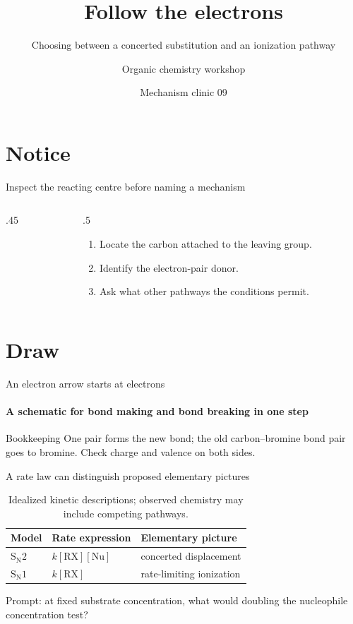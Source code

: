 \documentclass[11pt,aspectratio=169]{beamer}
\title{Follow the electrons}
\subtitle{Choosing between a concerted substitution and an ionization pathway}
\author{Organic chemistry workshop}
\date{Mechanism clinic 09}
\begin{document}
\begin{frame}[plain]\titlepage\end{frame}
\section{Notice}
\begin{frame}{Inspect the reacting centre before naming a mechanism}
\begin{columns}[c]
\begin{column}{.45\textwidth}\centering
{}
\bigskip\par
{\footnotesize{}}
\end{column}
\begin{column}{.5\textwidth}
\begin{enumerate}[<+->]
\item Locate the carbon attached to the leaving group.
\item Identify the electron-pair donor.
\item Ask what other pathways the conditions permit.
\end{enumerate}
\end{column}
\end{columns}
\end{frame}
\section{Draw}
\begin{frame}{An electron arrow starts at electrons}
\framesubtitle{A schematic for bond making and bond breaking in one step}
\centering
{}
\begin{block}{Bookkeeping}
One pair forms the new bond; the old carbon--bromine bond pair goes to bromine. Check charge and valence on both sides.
\end{block}
\end{frame}
\begin{frame}{A rate law can distinguish proposed elementary pictures}
\begin{table}\centering
\begin{tabular}{lll}\toprule
Model & Rate expression & Elementary picture\\\midrule
$\mathrm{S_N2}$ & $k[\mathrm{RX}][\mathrm{Nu}]$ & concerted displacement\\
$\mathrm{S_N1}$ & $k[\mathrm{RX}]$ & rate-limiting ionization\\\bottomrule
\end{tabular}
\caption{Idealized kinetic descriptions; observed chemistry may include competing pathways.}
\end{table}
\pause
\alert{Prompt:} at fixed substrate concentration, what would doubling the nucleophile concentration test?
\end{frame}
\end{document}
